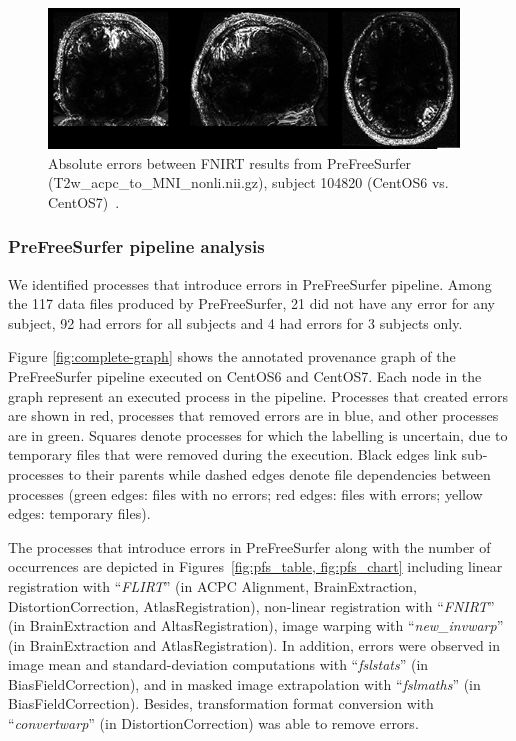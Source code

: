 \documentclass[a4paper,num-refs]{oup-contemporary}
\begin{document}
\begin{figure}
\centering
  \includegraphics[width=\columnwidth]{images/fnirt_result.png} 
  \caption{Absolute errors between FNIRT results from PreFreeSurfer 
  (T2w\_acpc\_to\_MNI\_nonli.nii.gz), subject 104820 (CentOS6 vs. 
  CentOS7)~\cite{Scaria2017}. } 
  \label{fig:fnirt_result}
\end{figure}

\subsubsection{PreFreeSurfer pipeline analysis} 

We identified processes that introduce errors in PreFreeSurfer 
pipeline. Among the 117 data files produced by PreFreeSurfer, 21 did 
not have any error for any subject, 92 had errors for all subjects and 
4 had errors for 3 subjects only. 

Figure \ref{fig:complete-graph} shows the annotated provenance graph 
of the PreFreeSurfer pipeline executed on CentOS6 and CentOS7. Each 
node in the graph represent an executed process in the pipeline. 
Processes that created errors are shown in red, processes that removed 
errors are in blue, and other processes are in green.  Squares denote 
processes for which the labelling is uncertain, due to temporary 
files that were removed during the execution. Black edges link 
sub-processes to their parents while dashed edges denote file 
dependencies between processes (green edges: files with no errors; red 
edges: files with errors; yellow edges: temporary files).

The processes that introduce errors in PreFreeSurfer along with the 
number of occurrences are depicted in Figures~\ref{fig:pfs_table, 
fig:pfs_chart} including linear registration with “\emph{FLIRT}” (in 
ACPC Alignment, BrainExtraction, DistortionCorrection, 
AtlasRegistration), non-linear registration with “\emph{FNIRT}” (in 
BrainExtraction and AltasRegistration), image warping with 
“\emph{new\_invwarp}” (in BrainExtraction and AtlasRegistration).  In 
addition, errors were observed in image mean and standard-deviation 
computations with “\emph{fslstats}” (in BiasFieldCorrection), and in 
masked image extrapolation with “\emph{fslmaths}” (in 
BiasFieldCorrection).  Besides, transformation format conversion with 
“\emph{convertwarp}” (in DistortionCorrection) was able to remove 
errors.
\end{document}
